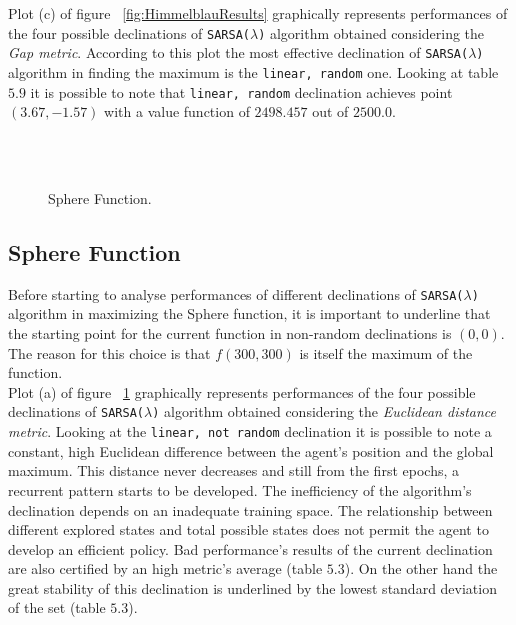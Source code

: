 Plot (c) of figure ~\ref{fig:HimmelblauResults} graphically represents performances of the four possible declinations of {\tt SARSA($\lambda$)} algorithm obtained considering the \textit{Gap metric}. According to this plot the most effective declination of {\tt SARSA($\lambda$)} algorithm in finding the maximum is the {\tt linear, random} one. Looking at table $5.9$ it is possible to note that {\tt linear, random} declination achieves point $(3.67, -1.57)$ with a value function of $2498.457$ out of $2500.0$.

\begin{figure}[h!]
	\begin{center}
		\\
		 \\
		
	\end{center}
	\caption{
		Sphere Function.
	}
	\label{fig:ParabolicResults}
\end{figure}


\subsection{Sphere Function} Before starting to analyse performances of different declinations of {\tt SARSA($\lambda$)} algorithm in maximizing the Sphere function, it is important to underline that the starting point for the current function in non-random declinations is $(0, 0)$. The reason for this choice is that $f(300, 300)$ is itself the maximum of the function. \\

Plot (a) of figure ~\ref{fig:ParabolicResults} graphically represents performances of the four possible declinations of {\tt SARSA($\lambda$)} algorithm obtained considering the \textit{Euclidean distance metric}. Looking at the {\tt linear, not random} declination it is possible to note a constant, high Euclidean difference between the agent's position and the global maximum. This distance never decreases and still from the first epochs, a recurrent pattern starts to be developed. The inefficiency of the algorithm's declination depends on an inadequate training space. The relationship between different explored states and total possible states does not permit the agent to develop an efficient policy. Bad performance's results of the current declination are also certified by an high metric's average (table $5.3$). On the other hand the great stability of this declination is underlined by the lowest standard deviation of the set (table $5.3$).

